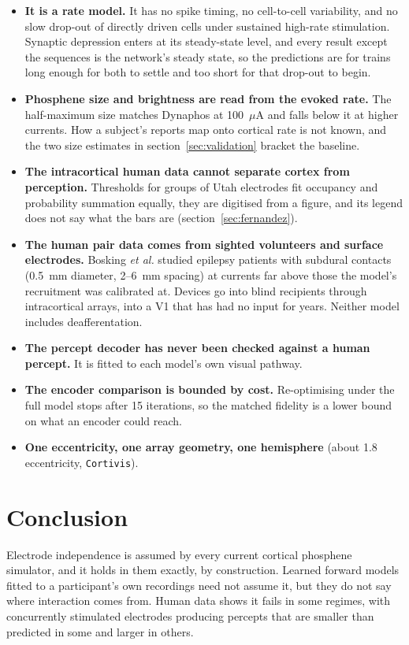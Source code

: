 \documentclass[10pt,twocolumn]{article}
\newcommand{\uA}{\ensuremath{\mu\text{A}}}
\begin{document}
\begin{itemize}[leftmargin=1.1em,itemsep=0.2em,topsep=0.2em]
\item \textbf{It is a rate model.} It has no spike timing, no cell-to-cell
  variability, and no slow drop-out of directly driven cells under
  sustained high-rate stimulation. Synaptic depression enters at its
  steady-state level, and every result except the sequences is the
  network's steady state, so the predictions are for trains long enough
  for both to settle and too short for that drop-out to begin.
\item \textbf{Phosphene size and brightness are read from the evoked
  rate.} The half-maximum size matches Dynaphos at 100~\uA{} and falls
  below it at higher currents. How a subject's reports map onto cortical
  rate is not known, and the two size estimates in
  section~\ref{sec:validation} bracket the baseline.
\item \textbf{The intracortical human data cannot separate cortex from
  perception.} Thresholds for groups of Utah electrodes fit occupancy and
  probability summation equally, they are digitised from a figure, and its
  legend does not say what the bars are (section~\ref{sec:fernandez}).
\item \textbf{The human pair data comes from sighted volunteers and
  surface electrodes.} Bosking \textit{et al.} studied epilepsy patients
  with subdural contacts (0.5~mm diameter, 2--6~mm spacing) at currents
  far above those the model's recruitment was calibrated at. Devices go
  into blind recipients through intracortical arrays, into a V1 that has
  had no input for years. Neither model includes deafferentation.
\item \textbf{The percept decoder has never been checked against a human
  percept.} It is fitted to each model's own visual pathway.
\item \textbf{The encoder comparison is bounded by cost.} Re-optimising
  under the full model stops after 15 iterations, so the matched fidelity
  is a lower bound on what an encoder could reach.
\item \textbf{One eccentricity, one array geometry, one hemisphere}
  (about 1.8\textdegree{} eccentricity, \texttt{Cortivis}).
\end{itemize}

\section{Conclusion}

Electrode independence is assumed by every current cortical phosphene
simulator, and it holds in them exactly, by construction. Learned forward
models fitted to a participant's own recordings need not assume it, but
they do not say where interaction comes from. Human data shows
it fails in some regimes, with concurrently stimulated electrodes producing
percepts that are smaller than predicted in some and larger in others.
\end{document}
